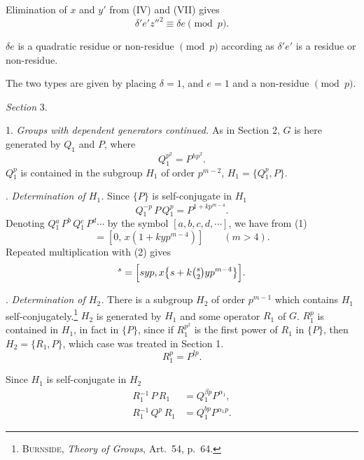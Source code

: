 \documentclass[oneside]{article}
\begin{document}
Elimination of $x$ and $y'$ from (IV) and (VII) gives
\begin{equation*}
\delta'e'z''^2 \equiv \delta e \pmod{p}.
\end{equation*}

$\delta e$ is a quadratic residue or non-residue $\pmod{p}$ according as
$\delta'e'$ is a residue or non-residue.

The two types are given by placing $\delta = 1$, and $e = 1$ and a
non-residue $\pmod{p}$.

\bigskip
\begin{center}
\textit{Section} 3.
\end{center}
\setcounter{equation}{0}

1. \textit{Groups with dependent generators continued.} As in Section 2, $G$
is here generated by $Q_1$ and $P$, where
\begin{equation*}
Q{}_1^{p^2} = P^{hp^2}.
\end{equation*}
\noindent $Q{}_1^p$ is contained in the subgroup $H_1$ of order $p^{m-2}$, $H_1
= \{Q{}_1^p, P\}$.

. \textit{Determination of $H_1$.} Since $\{P\}$ is self-conjugate in $H_1$
\begin{equation}
Q{}_1^{-p}\, P\, Q{}_1^p = P^{1 + kp^{m-4}}. %
\end{equation}
\noindent Denoting $Q{}_1^a\, P^b\, Q{}_1^c\, P^d \cdots$ by the symbol $[a, b, c, d,
\cdots]$, we have from (1)
\begin{equation}
[-yp,\, x,\, yp] = [0,\, x(1 + kyp^{m-4})] \qquad (m > 4). %
\end{equation}
\noindent Repeated multiplication with (2) gives
\begin{equation}
[yp, x]^s = \Bigl[syp, x\bigl\{s + k\tbinom{s}{2}yp^{m-4}\bigr\}\Bigr]. %
\end{equation}

. \textit{Determination of $H_2$.} There is a subgroup $H_2$ of order $p^{m-1}$
which contains $H_1$ self-conjugately.\footnote{\textsc{Burnside}, \textit{Theory of
Groups}, Art.\ 54, p.\ 64.} $H_2$ is generated by $H_1$ and some operator
$R_1$ of $G$. $R{}_1^p$ is contained in $H_1$, in fact in $\{P\}$,
since if $R{}_1^{p^2}$ is the first power of $R_1$ in $\{P\}$, then $H_2
= \{R_1, P\}$, which case was treated in Section 1.
\begin{equation}
R{}_1^p = P^{lp}. %
\end{equation}

Since $H_1$ is self-conjugate in $H_2$
\begin{align}
R{}_1^{-1}\, P\, R_1   &= Q{}_1^{\beta p} P^{\alpha_1}, \\
R{}_1^{-1}\, Q^p\, R_1 &= Q{}_1^{bp} P^{\alpha_1 p}.
\end{align}
\end{document}
